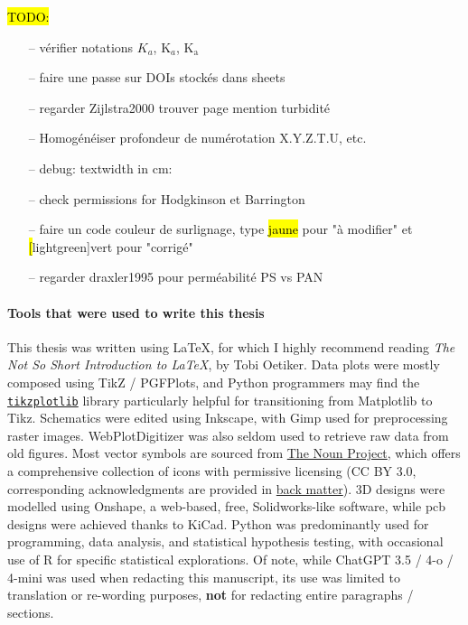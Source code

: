 \vfill

\hl{TODO:}
\begin{enumerate}
	\item[--] vérifier notations $K_a$, K$_a$, K$_\text{a}$
	\item[--] faire une passe sur DOIs stockés dans sheets
	\item[--] regarder Zijlstra2000 trouver page mention turbidité
	\item[--] Homogénéiser profondeur de numérotation X.Y.Z.T.U, etc.
	\item[--] debug: textwidth in cm: \prntlen{\textwidth}
	\item[--] check permissions for Hodgkinson et Barrington
	\item[--] faire un code couleur de surlignage, type \hl{jaune} pour "à modifier" et \hl[lightgreen]{vert} pour "corrigé"
	\item[--] regarder draxler1995 pour perméabilité PS vs PAN
\end{enumerate}

\vfill
\setcounter{secnumdepth}{3}

\paragraph{Tools that were used to write this thesis} \hphantom{text}

This thesis was written using \LaTeX{}, for which I highly recommend reading \emph{The Not So Short Introduction to \LaTeX}, by Tobi Oetiker\cite{oetiker2007}. Data plots were mostly composed using TikZ / PGFPlots, and Python programmers may find the \href{https://web.archive.org/web/20240506065201/https://pypi.org/project/tikzplotlib/}{\texttt{tikzplotlib}} library particularly helpful for transitioning from Matplotlib to Tikz. Schematics were edited using Inkscape, with Gimp used for preprocessing raster images. WebPlotDigitizer was also seldom used to retrieve raw data from old figures. Most vector symbols are sourced from \href{https://web.archive.org/web/20240505215016/https://thenounproject.com/}{The Noun Project}, which offers a comprehensive collection of icons with permissive licensing (CC BY 3.0, corresponding acknowledgments are provided in \hyperref[chap:add_ack]{back matter}). 3D designs were modelled using Onshape, a web-based, free, Solidworks-like software, while \gls{pcb} designs were achieved thanks to KiCad. Python was predominantly used for programming, data analysis, and statistical hypothesis testing, with occasional use of R for specific statistical explorations. Of note, while ChatGPT 3.5 / 4-o / 4-mini was used when redacting this manuscript, its use was limited to translation or re-wording purposes, \textbf{not} for redacting entire paragraphs / sections.

\setcounter{secnumdepth}{4}